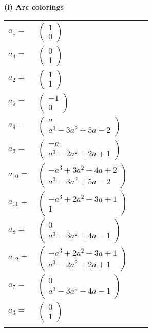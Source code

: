 \documentclass[1p]{elsarticle_modified}
\theoremstyle{definition}
\begin{document}
\flushleft \textbf{(i) Arc colorings}\\
\begin{tabular}{m{7pt} m{180pt} m{7pt} m{180pt} }
\flushright $a_{1}=$&$\begin{pmatrix}1\\0\end{pmatrix}$ \\
\flushright $a_{4}=$&$\begin{pmatrix}0\\1\end{pmatrix}$ \\
\flushright $a_{2}=$&$\begin{pmatrix}1\\1\end{pmatrix}$ \\
\flushright $a_{5}=$&$\begin{pmatrix}-1\\0\end{pmatrix}$ \\
\flushright $a_{9}=$&$\begin{pmatrix}a\\a^3-3 a^2+5 a-2\end{pmatrix}$ \\
\flushright $a_{6}=$&$\begin{pmatrix}- a\\a^3-2 a^2+2 a+1\end{pmatrix}$ \\
\flushright $a_{10}=$&$\begin{pmatrix}- a^3+3 a^2-4 a+2\\a^3-3 a^2+5 a-2\end{pmatrix}$ \\
\flushright $a_{11}=$&$\begin{pmatrix}- a^3+2 a^2-3 a+1\\1\end{pmatrix}$ \\
\flushright $a_{8}=$&$\begin{pmatrix}0\\a^3-3 a^2+4 a-1\end{pmatrix}$ \\
\flushright $a_{12}=$&$\begin{pmatrix}- a^3+2 a^2-3 a+1\\a^3-2 a^2+2 a+1\end{pmatrix}$ \\
\flushright $a_{7}=$&$\begin{pmatrix}0\\a^3-3 a^2+4 a-1\end{pmatrix}$ \\
\flushright $a_{3}=$&$\begin{pmatrix}0\\1\end{pmatrix}$\\&\end{tabular}
\end{document}
